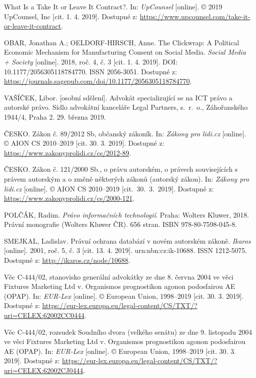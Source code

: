\documentclass[thesis=B,czech]{FITthesis}[2012/06/26]
\begin{document}
\begin{thebibliography}{99}
	What Is a Take It or Leave It Contract?. In: \textit{UpCounsel} [online]. © 2019 UpCounsel, Inc [cit. 1. 4. 2019]. Dostupné z: \url{https://www.upcounsel.com/take-it-or-leave-it-contract}.
	
	OBAR, Jonathan A.; OELDORF-HIRSCH, Anne. The Clickwrap: A Political Economic Mechanism for Manufacturing Consent on Social Media. \textit{Social Media + Society} [online]. 2018, roč. 4, č. 3 [cit. 1. 4. 2019]. DOI: 10.1177/2056305118784770. ISSN 2056-3051. Dostupné z: \url{https://journals.sagepub.com/doi/10.1177/2056305118784770}.
	
	VAŠÍČEK, Libor. [osobní sdělení]. Advokát specializující se na ICT právo a autorské právo. Sídlo advokátní kanceláře Legal Partners, s.~r.~o., Záhořanského 1944/4, Praha 2. 29. března 2019.
	
	ČESKO. Zákon č. 89/2012 Sb, občanský zákoník. In: \textit{Zákony pro lidi.cz} [online]. © AION CS 2010--2019 [cit. 30. 3. 2019]. Dostupné z: \url{https://www.zakonyprolidi.cz/cs/2012-89}.
	
	ČESKO. Zákon č. 121/2000 Sb., o právu autorském, o právech souvisejících s právem autorským a o změně některých zákonů (autorský zákon). In: \textit{Zákony pro lidi.cz} [online]. © AION CS 2010--2019 [cit.~30.~3.~2019]. Dostupné z: \url{https://www.zakonyprolidi.cz/cs/2000-121}.
	
	POLČÁK, Radim. \textit{Právo informačních technologií}. Praha: Wolters Kluwer, 2018. Právní monografie (Wolters Kluwer ČR). 656 stran. ISBN 978-80-7598-045-8.
	
	SMEJKAL, Ladislav. Právní ochrana databází v novém autorském zákoně. \textit{Ikaros} [online]. 2001, roč. 5, č. 3 [cit. 13. 4. 2019]. urn:nbn:cz:ik-10688. ISSN 1212-5075. Dostupné z: \url{http://ikaros.cz/node/10688}.
	
	Věc C-444/02, stanovisko generální advokátky ze dne 8. června 2004 ve věci Fixtures Marketing Ltd v. Organismos prognostikon agonon podosfairou AE (OPAP). In: \textit{EUR-Lex} [online]. © European Union, 1998--2019 [cit. 30. 3. 2019]. Dostupné z: \url{https://eur-lex.europa.eu/legal-content/CS/TXT/?uri=CELEX:62002CC0444}.
	
	Věc C-444/02, rozsudek Soudního dvora (velkého senátu) ze dne 9. listopadu 2004 ve věci Fixtures Marketing Ltd v. Organismos prognostikon agonon podosfairou AE (OPAP). In: \textit{EUR-Lex} [online]. © European Union, 1998--2019 [cit. 30. 3. 2019]. Dostupné z: \url{https://eur-lex.europa.eu/legal-content/CS/TXT/?uri=CELEX:62002CJ0444}.
	

\end{thebibliography}
\end{document}
